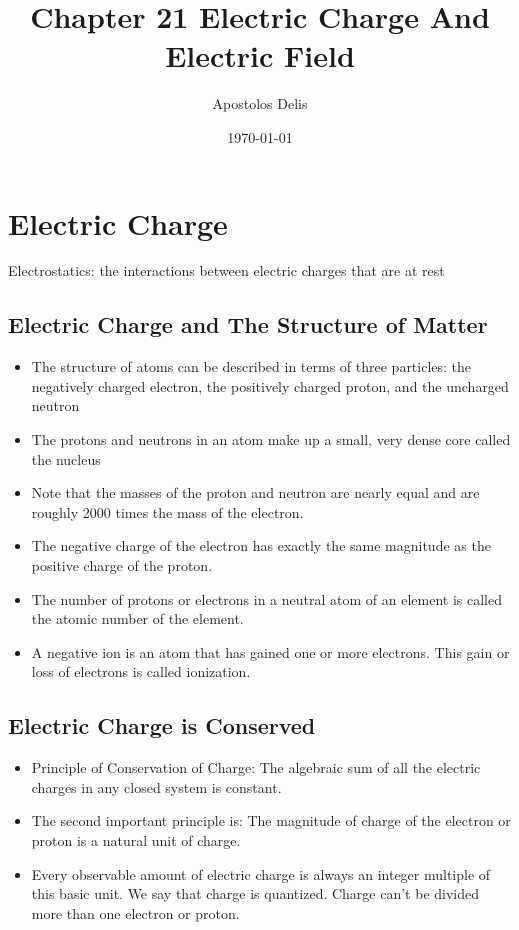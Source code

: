 \documentclass[11pt, a4paper]{article}
\begin{document}
\title{Chapter 21 Electric Charge And Electric Field}
\author{Apostolos Delis}
\date{\today}
\maketitle

\tableofcontents
\section[21.1, Electric Charge]{Electric Charge}
Electrostatics: the interactions between electric charges that are at rest
\subsection{Electric Charge and The Structure of Matter}
\begin{itemize}
    \item The structure of atoms can be described in terms of three particles: the
        negatively charged electron, the positively charged proton, and the uncharged
        neutron
    \item The protons and neutrons in an atom make up a small, very dense core called the
        nucleus
    \item Note that the masses of the proton and neutron are nearly equal and are roughly
        2000 times the mass of the electron.
    \item The negative charge of the electron has exactly the same magnitude as the
        positive charge of the proton.
    \item The number of protons or electrons in a neutral atom of an element is called
        the atomic number of the element.
    \item A negative ion is an atom that has gained one or more electrons. This gain or
        loss of electrons is called ionization.
\end{itemize}
\subsection{Electric Charge is Conserved}
\begin{itemize}
    \item Principle of Conservation of Charge: The algebraic sum of all the electric
        charges in any closed system is constant.
    \item The second important principle is: The magnitude of charge of the electron
        or proton is a natural unit of charge.
    \item Every observable amount of electric charge is always an integer multiple of this
        basic unit. We say that charge is quantized. Charge can't be divided more than
        one electron or proton.
\end{itemize}
\end{document}
